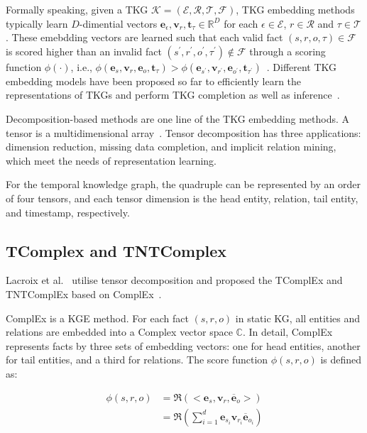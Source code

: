 Formally speaking, given a TKG $\mathcal{K} = (\mathcal{E,R,T,F})$, TKG embedding methods typically learn $D$-dimential vectors $\mathbf{e}_\epsilon, \mathbf{v}_r, \mathbf{t}_\tau \in \mathbb{R}^D$ for each $\epsilon \in \mathcal{E}$, $r\in\mathcal{R}$ and $\tau\in \mathcal{T}$. These emebdding vectors are learned such that each valid fact $(s,r,o,\tau) \in \mathcal{F}$ is scored higher than an invalid fact $\left(s^{\prime}, r^{\prime}, o^{\prime}, \tau^{\prime}\right) \notin \mathcal{F}$ through a scoring function $\phi(·)$, i.e., $\phi\left(\mathbf{e}_s, \mathbf{v}_r, \mathbf{e}_o, \mathbf{t}_\tau\right)>\phi\left(\mathbf{e}_{s^{\prime}}, \mathbf{v}_{r^{\prime}}, \mathbf{e}_{o^{\prime}}, \mathbf{t}_{\tau^{\prime}}\right)$~\cite{kazemiRepresentationLearningDynamic2020}. Different TKG embedding models have been proposed so far to efficiently learn the representations of TKGs and perform TKG completion as well as inference~\cite {zhangSurveyTemporalKnowledge2024b}.

Decomposition-based methods are one line of the TKG embedding methods. A tensor is a multidimensional array~\cite{kolda2009tensor}.
Tensor decomposition has three applications: dimension reduction, missing data completion, and implicit relation mining, which meet the needs of representation learning.~\cite{caiSurveyTemporalKnowledge2024}

For the temporal knowledge graph, the quadruple can be represented by an order of four tensors, and each tensor dimension is the head entity, relation, tail entity, and timestamp, respectively.

\subsection{TComplex and TNTComplex}
Lacroix et al.~\cite{lacroixTensorDecompositionsTemporal2020} utilise tensor decomposition and proposed the TComplEx and TNTComplEx based on ComplEx~\cite{trouillonComplexEmbeddingsSimple2016}. 

ComplEx is a KGE method. For each fact $(s, r, o)$ in static KG, all entities and relations are embedded into a Complex vector space $\mathbb{C}$. In detail, ComplEx represents facts by three sets of embedding vectors: one for head entities, another for tail entities, and a third for relations. The score function $\phi (s, r, o)$ is defined as: 

$$
\begin{aligned}
\phi(s, r, o) & =\mathfrak{R}\left(<\boldsymbol{e}_s, \boldsymbol{v}_r, \overline{\boldsymbol{e}}_o>\right) \\
& =\mathfrak{R}\left(\sum_{i=1}^d \boldsymbol{e}_{s_i} \boldsymbol{v}_{r_i} \overline{\boldsymbol{e}}_{o_i}\right)
\end{aligned}
$$

